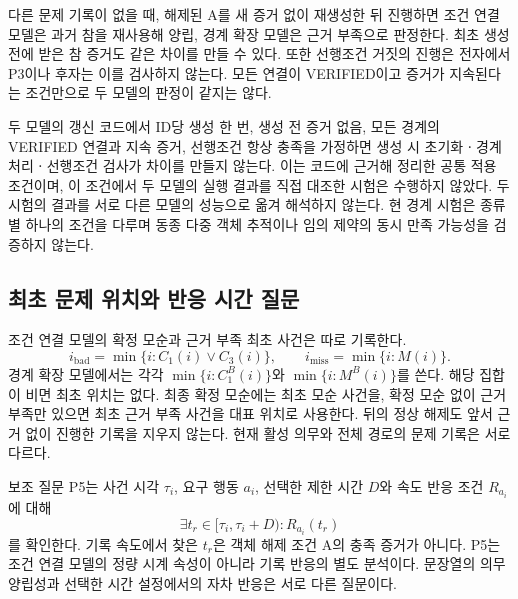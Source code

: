 \begin{revision}
다른 문제 기록이 없을 때, 해제된 A를 새 증거 없이 재생성한 뒤 진행하면 조건 연결 모델은 과거 참을 재사용해 양립, 경계 확장 모델은 근거 부족으로 판정한다. 최초 생성 전에 받은 참 증거도 같은 차이를 만들 수 있다. 또한 선행조건 거짓의 진행은 전자에서 P3이나 후자는 이를 검사하지 않는다. 모든 연결이 VERIFIED이고 증거가 지속된다는 조건만으로 두 모델의 판정이 같지는 않다.

두 모델의 갱신 코드에서 ID당 생성 한 번, 생성 전 증거 없음, 모든 경계의 VERIFIED 연결과 지속 증거, 선행조건 항상 충족을 가정하면 생성 시 초기화ㆍ경계 처리ㆍ선행조건 검사가 차이를 만들지 않는다. 이는 코드에 근거해 정리한 공통 적용 조건이며, 이 조건에서 두 모델의 실행 결과를 직접 대조한 시험은 수행하지 않았다. 두 시험의 결과를 서로 다른 모델의 성능으로 옮겨 해석하지 않는다. 현 경계 시험은 종류별 하나의 조건을 다루며 동종 다중 객체 추적이나 임의 제약의 동시 만족 가능성을 검증하지 않는다.

\subsection{최초 문제 위치와 반응 시간 질문}
\label{sec:issue-definition}
조건 연결 모델의 확정 모순과 근거 부족 최초 사건은 따로 기록한다.
\begin{equation}
 i_{\mathrm{bad}}=\min\{i:C_1(i)\lor C_3(i)\},\qquad
 i_{\mathrm{miss}}=\min\{i:M(i)\}.
\end{equation}
경계 확장 모델에서는 각각 $\min\{i:C_1^B(i)\}$와 $\min\{i:M^B(i)\}$를 쓴다. 해당 집합이 비면 최초 위치는 없다. 최종 확정 모순에는 최초 모순 사건을, 확정 모순 없이 근거 부족만 있으면 최초 근거 부족 사건을 대표 위치로 사용한다. 뒤의 정상 해제도 앞서 근거 없이 진행한 기록을 지우지 않는다. 현재 활성 의무와 전체 경로의 문제 기록은 서로 다르다.

보조 질문 P5는 사건 시각 $\tau_i$, 요구 행동 $a_i$, 선택한 제한 시간 $D$와 속도 반응 조건 $R_{a_i}$에 대해
\begin{equation}
\exists t_r\in[\tau_i,\tau_i+D):R_{a_i}(t_r)
\label{eq:response-contract}
\end{equation}
를 확인한다. 기록 속도에서 찾은 $t_r$은 객체 해제 조건 A의 충족 증거가 아니다. P5는 조건 연결 모델의 정량 시계 속성이 아니라 기록 반응의 별도 분석이다. 문장열의 의무 양립성과 선택한 시간 설정에서의 자차 반응은 서로 다른 질문이다.
\end{revision}
